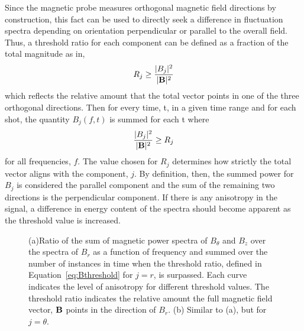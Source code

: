 \documentclass[preprint2]{aastex}
\begin{document}
Since the magnetic probe measures orthogonal magnetic field directions by construction, this fact can be used to directly seek a difference in fluctuation spectra depending on orientation perpendicular or parallel to the overall field. Thus, a threshold ratio for each component can be defined as a fraction of the total magnitude as in,
\begin{equation}
R_{j} \geq \frac{|B_{j}|^{2}}{|{\bf B}|^{2}}
\label{eq:Bthreshold}
\end{equation}
which reflects the relative amount that the total vector points in one of the three orthogonal directions. Then for every time, t, in a given time range and for each shot, the quantity $B_{j}(f,t)$ is summed for each t where
\begin{equation}
\frac{|B_{j}|^{2}}{|{\bf B}|^{2}} \geq R_{j}
\label{eq:Bcondition}
\end{equation}
for all frequencies, $f$. The value chosen for $R_{j}$ determines how strictly the total vector aligns with the component, $j$. By definition, then, the summed power for $B_{j}$ is considered the parallel component and the sum of the remaining two directions is the perpendicular component. If there is any anisotropy in the signal, a difference in energy content of the spectra should become apparent as the threshold value is increased.

\begin{figure}
\caption{\label{fig:thresholdmethod} (a)Ratio of the sum of magnetic power spectra of $B_{\theta}$ and $B_{z}$ over the spectra of $B_{r}$ as a function of frequency and summed over the number of instances in time when the threshold ratio, defined in Equation~\ref{eq:Bthreshold} for $j=r$, is surpassed. Each curve indicates the level of anisotropy for different threshold values. The threshold ratio indicates the relative amount the full magnetic field vector, ${\bf B}$ points in the direction of $B_{r}$. (b) Similar to (a), but for $j=\theta$.}
\end{figure}
\end{document}
